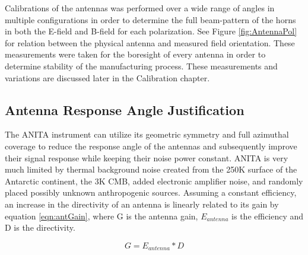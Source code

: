 	
	
	Calibrations of the antennas was performed over a wide range of angles in multiple configurations in order to determine the full beam-pattern of the horns in both the E-field and B-field for each polarization. See Figure \ref{fig:AntennaPol} for relation between the physical antenna and measured field orientation.  These measurements were taken for the boresight of every antenna in order to determine stability of the manufacturing process.  These measurements and variations are discussed later in the Calibration chapter.
	

	\subsection{Antenna Response Angle Justification}
		The ANITA instrument can utilize its geometric symmetry and full azimuthal coverage to reduce the response angle of the antennas and subsequently improve their signal response while keeping their noise power constant.  ANITA is very much limited by thermal background noise created from the 250K surface of the Antarctic continent, the 3K CMB, added electronic amplifier noise, and randomly placed possibly unknown anthropogenic sources.  Assuming a constant efficiency, an increase in the directivity of an antenna is linearly related to its gain by equation \ref{eqn:antGain}, where G is the antenna gain, $E_{antenna}$ is the efficiency and D is the directivity.
		
\begin{equation}
	\label{eqn:antGain}
	G = E_{antenna} * D
\end{equation}
		
